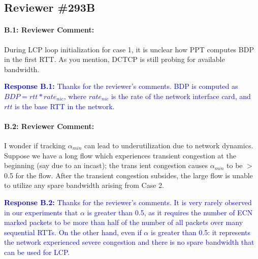 \documentclass[12pt,one-column]{article}
\begin{document}

\subsection{Reviewer \#293B}
{\it \paragraph{B.1: Reviewer Comment:} During LCP loop initialization for case 1, it is unclear how PPT computes BDP in the first RTT. As you mention, DCTCP is still probing for available bandwidth.}

\noindent\textcolor{blue}{\textbf{Response B.1:}
Thanks for the reviewer's comments. 
BDP is computed as $BDP = rtt*rate_{nic}$, where $rate_{nic}$ is the rate of the network interface card, and $rtt$ is the base RTT in the network.
}

{\it \paragraph{B.2: Reviewer Comment:} I wonder if tracking $\alpha_{min}$ can lead to underutilization due to network dynamics. Suppose we have a long flow which experiences transient congestion at the beginning (say due to an incast); the trans ient congestion causes $\alpha_{min}$ to be $>$ 0.5 for the flow. After the transient congestion subsides, the large flow is unable to utilize any spare bandwidth arising from Case 2.}

\noindent\textcolor{blue}{\textbf{Response B.2:}
Thanks for the reviewer’s comments. 
It is very rarely observed in our experiments that $\alpha$ is greater than 0.5, as it requires the number of ECN marked packets to be more than half of the number of all packets over many sequential RTTs.
On the other hand, even if $\alpha$ is greater than 0.5: it represents the network experienced severe congestion and there is no spare bandwidth that can be used for LCP.
}
\end{document}

